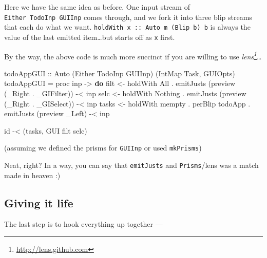 \documentclass[]{article}
\newenvironment{Shaded}{}{}
\newcommand{\DataTypeTok}[1]{\textcolor[rgb]{0.56,0.13,0.00}{#1}}
\newcommand{\FunctionTok}[1]{\textcolor[rgb]{0.02,0.16,0.49}{#1}}
\newcommand{\KeywordTok}[1]{\textcolor[rgb]{0.00,0.44,0.13}{\textbf{#1}}}
\newcommand{\NormalTok}[1]{#1}
\newcommand{\OperatorTok}[1]{\textcolor[rgb]{0.40,0.40,0.40}{#1}}
\newcommand{\OtherTok}[1]{\textcolor[rgb]{0.00,0.44,0.13}{#1}}
\renewcommand{\href}[2]{#2\footnote{\url{#1}}}
\begin{document}
Here we have the same idea as before. One input stream of
\texttt{Either\ TodoInp\ GUIInp} comes through, and we fork it into three blip
streams that each do what we want.
\texttt{holdWith\ x\ ::\ Auto\ m\ (Blip\ b)\ b} is always the value of the last
emitted item\ldots but starts off as \texttt{x} first.

By the way, the above code is much more succinct if you are willing to use
\emph{\href{http://lens.github.com}{lens}}\ldots{}

\begin{Shaded}
\begin{Highlighting}[]
\OtherTok{todoAppGUI ::} \DataTypeTok{Auto\textquotesingle{}}\NormalTok{ (}\DataTypeTok{Either} \DataTypeTok{TodoInp} \DataTypeTok{GUIInp}\NormalTok{) (}\DataTypeTok{IntMap} \DataTypeTok{Task}\NormalTok{, }\DataTypeTok{GUIOpts}\NormalTok{)}
\NormalTok{todoAppGUI }\OtherTok{=}\NormalTok{ proc inp }\OtherTok{{-}>} \KeywordTok{do}
\NormalTok{    filt  }\OtherTok{<{-}}\NormalTok{ holdWith }\DataTypeTok{All}
           \OperatorTok{.}\NormalTok{ emitJusts (preview (\_Right }\OperatorTok{.}\NormalTok{ \_GIFilter)) }\OperatorTok{{-}<}\NormalTok{ inp}
\NormalTok{    selc  }\OtherTok{<{-}}\NormalTok{ holdWith }\DataTypeTok{Nothing}
           \OperatorTok{.}\NormalTok{ emitJusts (preview (\_Right }\OperatorTok{.}\NormalTok{ \_GISelect)) }\OperatorTok{{-}<}\NormalTok{ inp}
\NormalTok{    tasks }\OtherTok{<{-}}\NormalTok{ holdWith }\FunctionTok{mempty} \OperatorTok{.}\NormalTok{ perBlip todoApp}
           \OperatorTok{.}\NormalTok{ emitJusts (preview \_Left)                }\OperatorTok{{-}<}\NormalTok{ inp}

    \FunctionTok{id} \OperatorTok{{-}<}\NormalTok{ (tasks, }\DataTypeTok{GUI}\NormalTok{ filt selc)}
\end{Highlighting}
\end{Shaded}

(assuming we defined the prisms for \texttt{GUIInp} or used
\texttt{\textquotesingle{}\textquotesingle{}mkPrisms})

Neat, right? In a way, you can say that \texttt{emitJusts} and
\texttt{Prisms}/lens was a match made in heaven :)

\hypertarget{giving-it-life}{%
\subsection{Giving it life}\label{giving-it-life}}

The last step is to hook everything up together ---
\end{document}
